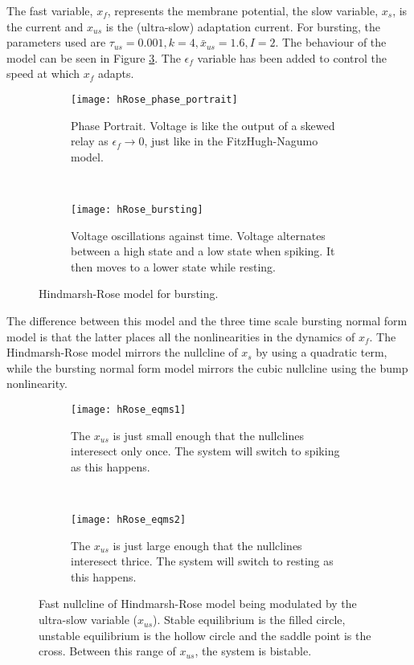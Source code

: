 \documentclass[a4paper, 12pt]{article}
\begin{document}
The fast variable, $x_f$, represents the membrane potential, the slow variable, $x_s$, is the current and $x_{us}$ is the (ultra-slow) adaptation current. For bursting, the parameters used are $\tau_{us} = 0.001, k = 4, \bar{x}_{us} = 1.6, I = 2$. The behaviour of the model can be seen in Figure \ref{fig:hRose_bursting}. The $\epsilon_f$ variable has been added to control the speed at which $x_f$ adapts. 

\begin{figure}[h!]
    \centering
    \begin{subfigure}[t]{0.48\textwidth}
        \texttt{[image: hRose\_phase\_portrait]}
        \caption{Phase Portrait. Voltage is like the output of a skewed relay as $\epsilon_f\rightarrow0$, just like in the FitzHugh-Nagumo model.}
        \label{fig:hRose_phase_portrait}
    \end{subfigure}
    ~ %
    \begin{subfigure}[t]{0.48\textwidth}
        \texttt{[image: hRose\_bursting]}
        \caption{Voltage oscillations against time. Voltage alternates between a high state and a low state when spiking. It then moves to a lower state while resting.}
        \label{fig:hRose_voltage_time}
    \end{subfigure}
\caption{Hindmarsh-Rose model for bursting.}
\label{fig:hRose_bursting}
\end{figure}

The difference between this model and the three time scale bursting normal form model is that the latter places all the nonlinearities in the dynamics of $x_f$. The Hindmarsh-Rose model mirrors the nullcline of $x_s$ by using a quadratic term, while the bursting normal form model mirrors the cubic nullcline using the bump nonlinearity. 

\begin{figure}[t]
    \centering
    \begin{subfigure}[t]{0.48\textwidth}
        \texttt{[image: hRose\_eqms1]}
        \caption{The $x_{us}$ is just small enough that the nullclines interesect only once. The system will switch to spiking as this happens.}
        \label{fig:hRose_eqms1}
    \end{subfigure}
    ~ %
    \begin{subfigure}[t]{0.48\textwidth}
        \texttt{[image: hRose\_eqms2]}
        \caption{The $x_{us}$ is just large enough that the nullclines interesect thrice. The system will switch to resting as this happens.}
        \label{fig:hRose_eqms2}
    \end{subfigure}
\caption{Fast nullcline of Hindmarsh-Rose model being modulated by the ultra-slow variable ($x_{us}$). Stable equilibrium is the filled circle, unstable equilibrium is the hollow circle and the saddle point is the cross. Between this range of $x_{us}$, the system is bistable.}
\label{fig:hRose_changing_eqms}
\end{figure}
\end{document}
